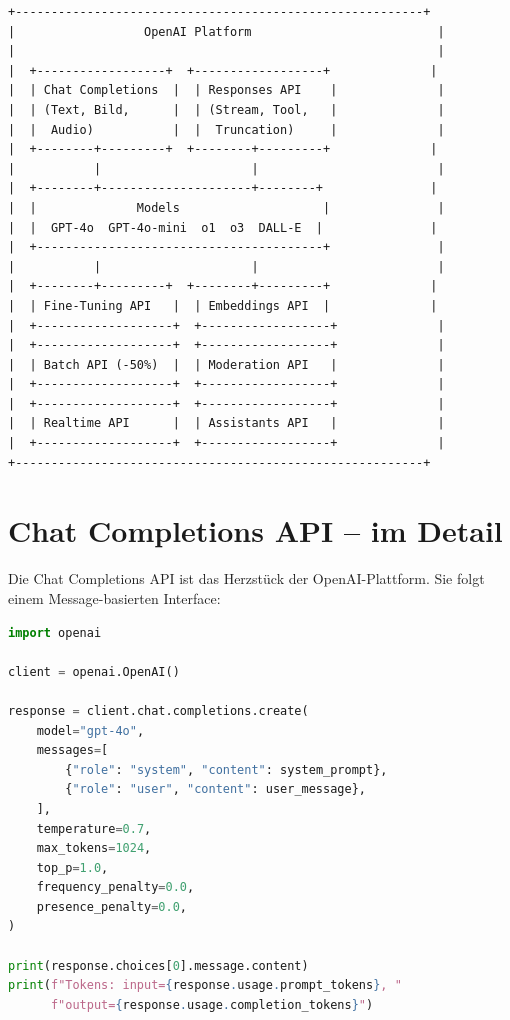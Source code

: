 \begin{verbatim}
+---------------------------------------------------------+
|                  OpenAI Platform                          |
|                                                           |
|  +------------------+  +------------------+              |
|  | Chat Completions  |  | Responses API    |              |
|  | (Text, Bild,      |  | (Stream, Tool,   |              |
|  |  Audio)           |  |  Truncation)     |              |
|  +--------+---------+  +--------+---------+              |
|           |                     |                         |
|  +--------+---------------------+--------+               |
|  |              Models                    |               |
|  |  GPT-4o  GPT-4o-mini  o1  o3  DALL-E  |               |
|  +----------------------------------------+               |
|           |                     |                         |
|  +--------+---------+  +--------+---------+              |
|  | Fine-Tuning API   |  | Embeddings API  |              |
|  +-------------------+  +------------------+              |
|  +-------------------+  +------------------+              |
|  | Batch API (-50%)  |  | Moderation API   |              |
|  +-------------------+  +------------------+              |
|  +-------------------+  +------------------+              |
|  | Realtime API      |  | Assistants API   |              |
|  +-------------------+  +------------------+              |
+---------------------------------------------------------+
\end{verbatim}

\section{Chat Completions API -- im Detail}

Die Chat Completions API ist das Herzstück der OpenAI-Plattform. Sie folgt einem Message-basierten Interface:

\begin{lstlisting}[language=Python, caption={Grundlegende Chat Completions API-Nutzung}, label=lst:chat-basic]
import openai

client = openai.OpenAI()

response = client.chat.completions.create(
    model="gpt-4o",
    messages=[
        {"role": "system", "content": system_prompt},
        {"role": "user", "content": user_message},
    ],
    temperature=0.7,
    max_tokens=1024,
    top_p=1.0,
    frequency_penalty=0.0,
    presence_penalty=0.0,
)

print(response.choices[0].message.content)
print(f"Tokens: input={response.usage.prompt_tokens}, "
      f"output={response.usage.completion_tokens}")
\end{lstlisting}

